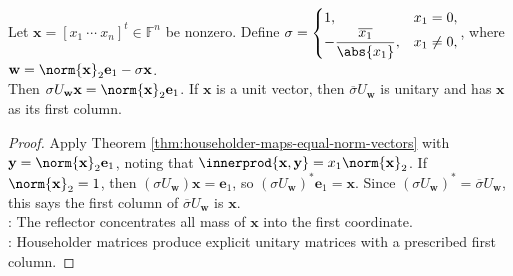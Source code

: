 \begin{corollary} \label{cor:householder-unitary-annihilator} \\
Let $\mathbf{x}=[x_1\ \cdots\ x_n]^t\in\mathbb{F}^n$ be nonzero. Define $\sigma=
\begin{cases}
1, & x_1=0,\\
-\dfrac{\overline{x_1}}{\abs{x_1}}, & x_1\neq0,
\end{cases}$, where $\mathbf{w}=\norm{\mathbf{x}}_2\mathbf{e}_1-\sigma\mathbf{x}$.\\
Then $\sigma U_{\mathbf{w}}\mathbf{x}=\norm{\mathbf{x}}_2\mathbf{e}_1$. If $\mathbf{x}$ is a unit vector, then $\overline{\sigma}U_{\mathbf{w}}$ is unitary and has $\mathbf{x}$ as its first column.
\begin{proof}
Apply Theorem \ref{thm:householder-maps-equal-norm-vectors} with $\mathbf{y}=\norm{\mathbf{x}}_2\mathbf{e}_1$, noting that $\innerprod{\mathbf{x},\mathbf{y}}=x_1\norm{\mathbf{x}}_2$. If $\norm{\mathbf{x}}_2=1$, then $(\sigma U_{\mathbf{w}})\mathbf{x}=\mathbf{e}_1$, so $(\sigma U_{\mathbf{w}})^*\mathbf{e}_1=\mathbf{x}$. Since $(\sigma U_{\mathbf{w}})^*=\overline{\sigma}U_{\mathbf{w}}$, this says the first column of $\overline{\sigma}U_{\mathbf{w}}$ is $\mathbf{x}$.\\
: The reflector concentrates all mass of $\mathbf{x}$ into the first coordinate.\\
: Householder matrices produce explicit unitary matrices with a prescribed first column.
\end{proof}
\end{corollary}
